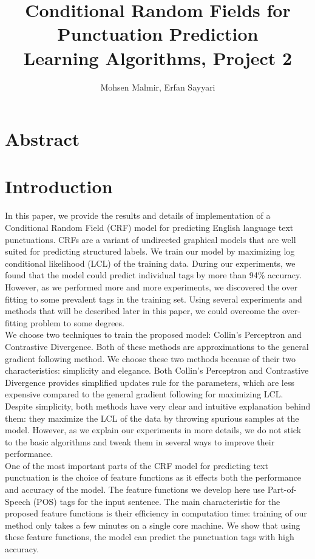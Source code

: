 \documentclass[twoside,12pt]{article}
\begin{document}
\title{ Conditional Random Fields for Punctuation Prediction\\  Learning Algorithms, Project 2}
\author{Mohsen Malmir, Erfan Sayyari}
\maketitle
\section{Abstract}

\section{Introduction}
In this paper, we provide the results and details of implementation of a Conditional Random Field (CRF) model for predicting English language text punctuations. CRFs are a variant of undirected graphical models that are well suited for predicting structured labels. We train our model by maximizing log conditional likelihood (LCL) of the training data. During our experiments, we found that the model could predict individual tags by more than 94\% accuracy. However, as we performed more and more experiments, we discovered the over fitting to some prevalent tags in the training set. Using several experiments and methods that will be described later in this paper, we could overcome the over-fitting problem to some degrees.\\
We choose two techniques to train the proposed model: Collin's Perceptron and Contrastive Divergence. Both of these methods are approximations to the general gradient following method. We choose these two methods because of their two characteristics: simplicity and elegance. Both Collin's Perceptron and Contrastive Divergence provides simplified updates rule for the parameters, which are less expensive compared to the general gradient following for maximizing LCL. Despite simplicity, both methods have very clear and intuitive explanation behind them: they maximize the LCL of the data by throwing spurious samples at the model. However, as we explain our experiments in more details, we do not stick to the basic algorithms and tweak them in several ways to improve their performance.\\
One of the most important parts of the CRF model for predicting text punctuation is the choice of feature functions as it effects both the performance and accuracy of the model. The feature functions we develop here use Part-of-Speech (POS) tags for the input sentence. The main characteristic for the proposed feature functions is their efficiency in computation time: training of our method only takes a few minutes on a single core machine. We show that using these feature functions, the model can predict the punctuation tags with high accuracy.\\ 
\end{document}
